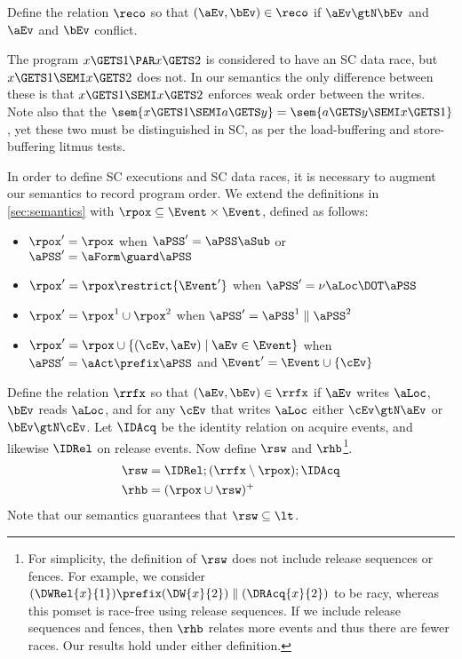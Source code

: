 Define the relation $\reco$ so that $(\aEv,\bEv)\in{\reco}$
if $\aEv\gtN\bEv$ and $\aEv$ and $\bEv$ conflict.

The program $x\GETS1\PAR x\GETS2$ is considered to have an SC data race, but
$x\GETS1\SEMI x\GETS2$ does not.  In our semantics the only difference
between these is that $x\GETS1\SEMI x\GETS2$ enforces weak order between the
writes.  Note also that the
$\sem{x\GETS1\SEMI a\GETS y}=\sem{a\GETS y\SEMI x\GETS1}$, yet these two must
be distinguished in SC, as per the load-buffering and store-buffering litmus tests.

In order to define SC executions and SC data races, it is necessary to
augment our semantics to record program order.  We extend the definitions in
\textsection\ref{sec:semantics} with
${\rpox}\subseteq{\Event}\times{\Event}$, defined as follows:
\begin{itemize}
\item
  ${\rpox'} = {\rpox}$
  when $\aPSS'=\aPSS\aSub$
  or $\aPSS'=\aForm\guard\aPSS$
\item
  ${\rpox'} = {\rpox}\restrict{\Event'}$
  when $\aPSS'=\nu\aLoc\DOT\aPSS$
\item
  ${\rpox'} = {\rpox}^1\cup{\rpox}^2$
  when $\aPSS'=\aPSS^1\parallel\aPSS^2$
\item
  ${\rpox'} = {\rpox}\cup\{(\cEv,\aEv)\mid\aEv\in\Event\}$
  when $\aPSS'=\aAct\prefix\aPSS$ and $\Event' = \Event \cup \{\cEv\}$
\end{itemize}

Define the relation ${\rrfx}$ so that $(\aEv,\bEv)\in{\rrfx}$ if $\aEv$
writes $\aLoc$, $\bEv$ reads $\aLoc$, and for any $\cEv$ that writes $\aLoc$
either $\cEv\gtN\aEv$ or $\bEv\gtN\cEv$.  Let $\IDAcq$ be the identity
relation on acquire events, and likewise $\IDRel$ on release events.  Now
define $\rsw$ and $\rhb$\footnote{For simplicity, the definition of $\rsw$
  does not include release sequences or fences.  For example, we consider
  \begin{math}
    (\DWRel{x}{1})\prefix(\DW{x}{2}) \parallel (\DRAcq{x}{2})
  \end{math}
  to be racy, whereas this pomset is race-free using release sequences.  If
  we include release sequences and fences, then $\rhb$ relates more events
  and thus there are fewer races. Our results hold under either definition.}.
\begin{align*}
  {\rsw} &= \IDRel; ({\rrfx}\setminus{\rpox}); \IDAcq
  \\
  {\rhb} &= ({\rpox} \cup {\rsw})^+
\end{align*}
Note that our semantics guarantees that ${\rsw}\subseteq{\lt}$.

